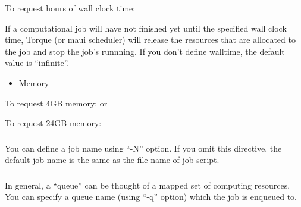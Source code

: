 \documentclass[letterpaper,10pt,english]{sphinxmanual}
\begin{document}
\begin{sphinxVerbatim}[commandchars=\\\{\}]
To request  hours of wall clock time:
\end{sphinxVerbatim}

If a computational job will have not finished yet until the specified wall clock time, Torque (or maui scheduler) will release the resources that are allocated to the job and stop the job’s runnning.
If you don’t define walltime, the default value is “infinite”.
\begin{itemize}
\item {} 
Memory

\end{itemize}

\begin{sphinxVerbatim}[commandchars=\\\{\}]
To request 4GB memory:
or

To request 24GB memory:
\end{sphinxVerbatim}


\subsubsection{}
\label{\detokenize{guide:job-name}}
You can define a job name using “-N” option. If you omit this directive, the default job name is the same as the file name of job script.

\begin{sphinxVerbatim}[commandchars=\\\{\}]
\end{sphinxVerbatim}


\subsubsection{}
\label{\detokenize{guide:queue-name}}
In general, a “queue” can be thought of a mapped set of computing resources. You can specify a queue name (using “-q” option) which the job is enqueued to.

\begin{sphinxVerbatim}[commandchars=\\\{\}]
\end{sphinxVerbatim}
\end{document}
